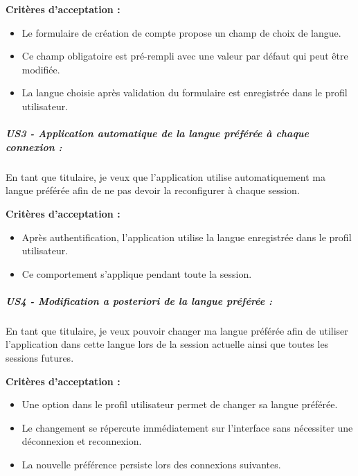 \textbf{Critères d'acceptation :}

\begin{itemize}
\tightlist
\item
  Le formulaire de création de compte propose un champ de choix de
  langue.
\item
  Ce champ obligatoire est pré-rempli avec une valeur par défaut qui
  peut être modifiée.
\item
  La langue choisie après validation du formulaire est enregistrée dans
  le profil utilisateur.
\end{itemize}

\hypertarget{us3---application-automatique-de-la-langue-pruxe9fuxe9ruxe9e-uxe0-chaque-connexion}{%
\subparagraph{US3 - Application automatique de la langue préférée à
chaque connexion
:}\label{us3---application-automatique-de-la-langue-pruxe9fuxe9ruxe9e-uxe0-chaque-connexion}}

En tant que titulaire, je veux que l'application utilise automatiquement
ma langue préférée afin de ne pas devoir la reconfigurer à chaque
session.

\textbf{Critères d'acceptation :}

\begin{itemize}
\tightlist
\item
  Après authentification, l'application utilise la langue enregistrée
  dans le profil utilisateur.
\item
  Ce comportement s'applique pendant toute la session.
\end{itemize}

\hypertarget{us4---modification-a-posteriori-de-la-langue-pruxe9fuxe9ruxe9e}{%
\subparagraph{US4 - Modification a posteriori de la langue préférée
:}\label{us4---modification-a-posteriori-de-la-langue-pruxe9fuxe9ruxe9e}}

En tant que titulaire, je veux pouvoir changer ma langue préférée afin
de utiliser l'application dans cette langue lors de la session actuelle
ainsi que toutes les sessions futures.

\textbf{Critères d'acceptation :}

\begin{itemize}
\tightlist
\item
  Une option dans le profil utilisateur permet de changer sa langue
  préférée.
\item
  Le changement se répercute immédiatement sur l'interface sans
  nécessiter une déconnexion et reconnexion.
\item
  La nouvelle préférence persiste lors des connexions suivantes.
\end{itemize}

